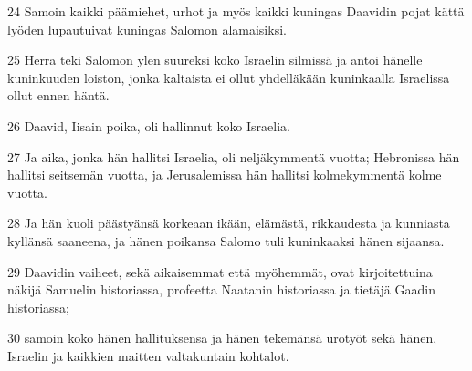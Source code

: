 \par 24 Samoin kaikki päämiehet, urhot ja myös kaikki kuningas Daavidin pojat kättä lyöden lupautuivat kuningas Salomon alamaisiksi.
\par 25 Herra teki Salomon ylen suureksi koko Israelin silmissä ja antoi hänelle kuninkuuden loiston, jonka kaltaista ei ollut yhdelläkään kuninkaalla Israelissa ollut ennen häntä.
\par 26 Daavid, Iisain poika, oli hallinnut koko Israelia.
\par 27 Ja aika, jonka hän hallitsi Israelia, oli neljäkymmentä vuotta; Hebronissa hän hallitsi seitsemän vuotta, ja Jerusalemissa hän hallitsi kolmekymmentä kolme vuotta.
\par 28 Ja hän kuoli päästyänsä korkeaan ikään, elämästä, rikkaudesta ja kunniasta kyllänsä saaneena, ja hänen poikansa Salomo tuli kuninkaaksi hänen sijaansa.
\par 29 Daavidin vaiheet, sekä aikaisemmat että myöhemmät, ovat kirjoitettuina näkijä Samuelin historiassa, profeetta Naatanin historiassa ja tietäjä Gaadin historiassa;
\par 30 samoin koko hänen hallituksensa ja hänen tekemänsä urotyöt sekä hänen, Israelin ja kaikkien maitten valtakuntain kohtalot.


